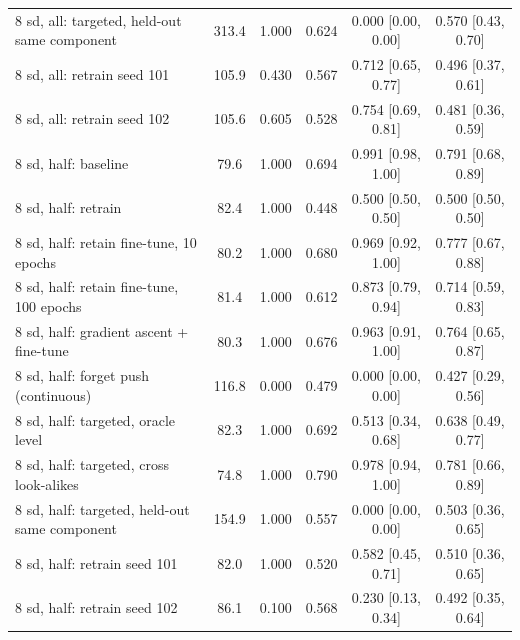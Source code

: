\begin{tabular}{lccccc}
8 sd, all: targeted, held-out same component & 313.4 & 1.000 & 0.624 & 0.000 [0.00, 0.00] & 0.570 [0.43, 0.70] \\
8 sd, all: retrain seed 101 & 105.9 & 0.430 & 0.567 & 0.712 [0.65, 0.77] & 0.496 [0.37, 0.61] \\
8 sd, all: retrain seed 102 & 105.6 & 0.605 & 0.528 & 0.754 [0.69, 0.81] & 0.481 [0.36, 0.59] \\
\midrule
8 sd, half: baseline & 79.6 & 1.000 & 0.694 & 0.991 [0.98, 1.00] & 0.791 [0.68, 0.89] \\
8 sd, half: retrain & 82.4 & 1.000 & 0.448 & 0.500 [0.50, 0.50] & 0.500 [0.50, 0.50] \\
8 sd, half: retain fine-tune, 10 epochs & 80.2 & 1.000 & 0.680 & 0.969 [0.92, 1.00] & 0.777 [0.67, 0.88] \\
8 sd, half: retain fine-tune, 100 epochs & 81.4 & 1.000 & 0.612 & 0.873 [0.79, 0.94] & 0.714 [0.59, 0.83] \\
8 sd, half: gradient ascent + fine-tune & 80.3 & 1.000 & 0.676 & 0.963 [0.91, 1.00] & 0.764 [0.65, 0.87] \\
8 sd, half: forget push (continuous) & 116.8 & 0.000 & 0.479 & 0.000 [0.00, 0.00] & 0.427 [0.29, 0.56] \\
8 sd, half: targeted, oracle level & 82.3 & 1.000 & 0.692 & 0.513 [0.34, 0.68] & 0.638 [0.49, 0.77] \\
8 sd, half: targeted, cross look-alikes & 74.8 & 1.000 & 0.790 & 0.978 [0.94, 1.00] & 0.781 [0.66, 0.89] \\
8 sd, half: targeted, held-out same component & 154.9 & 1.000 & 0.557 & 0.000 [0.00, 0.00] & 0.503 [0.36, 0.65] \\
8 sd, half: retrain seed 101 & 82.0 & 1.000 & 0.520 & 0.582 [0.45, 0.71] & 0.510 [0.36, 0.65] \\
8 sd, half: retrain seed 102 & 86.1 & 0.100 & 0.568 & 0.230 [0.13, 0.34] & 0.492 [0.35, 0.64] \\
\bottomrule
\end{tabular}
